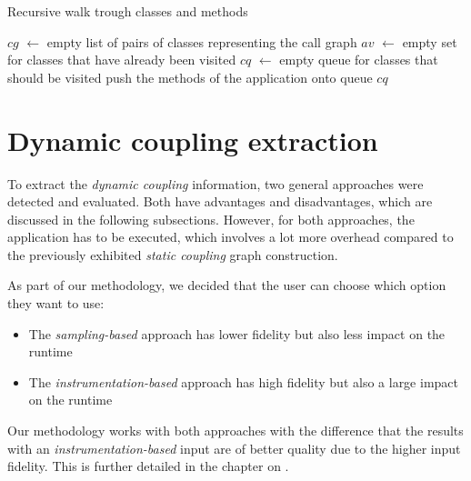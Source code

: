 \documentclass[12pt,a4paper]{report}
\begin{document}
\begin{algorithm}[ht]
\caption{Recursive walk trough classes and methods}
\label{algo:class-walk}
  \BlankLine
  \BlankLine
  $cg$ $\leftarrow$ empty list of pairs of classes representing the call graph\;
  $av$ $\leftarrow$ empty set for classes that have already been visited\;
  $cq$ $\leftarrow$ empty queue for classes that should be visited\;
  \BlankLine
  push the  methods of the application onto queue $cq$\;
  \BlankLine
  \BlankLine
  \;
\end{algorithm}



\section{Dynamic coupling extraction} \label{sect:dynamic-coupling-extraction}

To extract the \textit{dynamic coupling} information, two general approaches
were detected and evaluated. Both have advantages and disadvantages, which are
discussed in the following subsections. However, for both approaches, the
application has to be executed, which involves a lot more overhead compared to
the previously exhibited \textit{static coupling} graph construction.

As part of our methodology, we decided that the user can choose which option
they want to use:
\begin{itemize}[noitemsep]
  \item The \textit{sampling\hyp based} approach has lower fidelity but
        also less impact on the runtime
  \item The \textit{instrumentation\hyp based} approach has high fidelity but
        also a large impact on the runtime
\end{itemize}
Our methodology works with
both approaches with the difference that the results with an \textit{
instrumentation\hyp based} input are of better quality due to the higher input
fidelity. This is further detailed in the chapter on
\textit{}.
\end{document}
